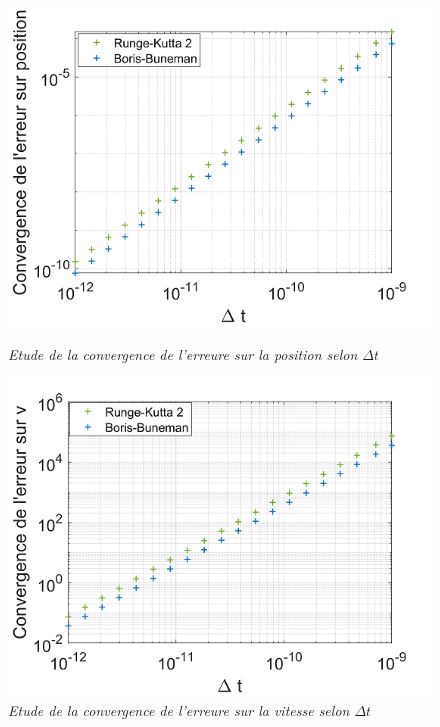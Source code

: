 \documentclass[a4paper,12pt,twoside]{article}
\begin{document}
	
	\begin{figure}[h]
				\begin{minipage}[c]{.46\linewidth}
					\centering
					\includegraphics[scale = 0.6]{conv_pos_RK_BB.png}
					\caption{\em\label{Fig: Conv Pos} Etude de la convergence de l'erreure sur la position selon $\Delta t$}
				\end{minipage}
				\hfill%
				\begin{minipage}[c]{.46\linewidth}
					\centering
					\includegraphics[scale = 0.6]{conv_vit_RK_BB.png}
					\caption{\em\label{Fig: Conv Vit} Etude de la convergence de l'erreure sur la vitesse selon $\Delta t$}
				\end{minipage}
			\end{figure}
\end{document}
